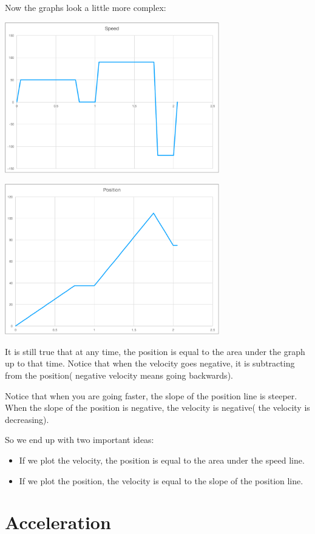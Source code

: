 Now the graphs look a little more complex:

\includegraphics[width=0.7\textwidth]{speed_stops.pdf}

\includegraphics[width=0.7\textwidth]{position_stops.pdf}

It is still true that at any time, the position is equal to the
area under the graph up to that time. Notice that when the velocity goes
negative, it is subtracting from the position( negative velocity means going backwards).

Notice that when you are going faster, the slope of the position line
is steeper. When the slope of the position is negative, the velocity is
negative( the velocity is decreasing).

So we end up with two important ideas:
\begin{itemize}
\item If we plot the velocity, the position is equal to the area under the speed line.
\item If we plot the position, the velocity is equal to the slope of the position line.
\end{itemize}

\section{Acceleration}

